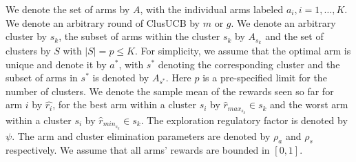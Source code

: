 We denote the set of arms by $A$, with the individual arms labeled $a_i, i=1,\ldots,K$.
We denote an arbitrary round of ClusUCB by $m$ or $g$. We denote an arbitrary cluster by $s_{k}$, the subset of arms within the cluster $s_k$ by  $A_{s_{k}}$  and the set of clusters by $S$ with $|S|=p\leq K$. For simplicity, we assume that the optimal arm is unique and denote it by $a^{*}$, with $s^{*}$ denoting the corresponding cluster and the subset of arms in $s^{*}$ is denoted by $A_{s^{*}}$. Here $p$ is a pre-specified limit for the number of clusters. 
We denote the sample mean of the rewards seen so far for arm $i$ by $\hat{r_i}$, for the best arm within a cluster $s_i$ by $\hat{r}_{max_{s_{k}}}\in s_{k}$ and the worst arm within a cluster $s_i$ by $\hat{r}_{min_{s_{k}}}\in s_{k}$. The exploration regulatory factor is denoted by $\psi$. The arm and cluster elimination parameters are denoted by $\rho_{a}$ and $\rho_{s}$ respectively.
We assume that all arms' rewards are bounded in $[0,1]$.
